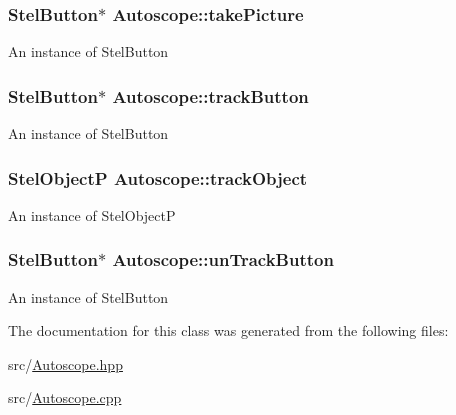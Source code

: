 \subsubsection[{\texorpdfstring{take\+Picture}{takePicture}}]{\setlength{\rightskip}{0pt plus 5cm}Stel\+Button$\ast$ Autoscope\+::take\+Picture\hspace{0.3cm}{\ttfamily [private]}}\hypertarget{class_autoscope_a8f64e1d50e979751403a70008f0d01da}{}\label{class_autoscope_a8f64e1d50e979751403a70008f0d01da}
An instance of Stel\+Button 
\subsubsection[{\texorpdfstring{track\+Button}{trackButton}}]{\setlength{\rightskip}{0pt plus 5cm}Stel\+Button$\ast$ Autoscope\+::track\+Button\hspace{0.3cm}{\ttfamily [private]}}\hypertarget{class_autoscope_a816e3212639b4204e9917704e02b0d09}{}\label{class_autoscope_a816e3212639b4204e9917704e02b0d09}
An instance of Stel\+Button 
\subsubsection[{\texorpdfstring{track\+Object}{trackObject}}]{\setlength{\rightskip}{0pt plus 5cm}Stel\+ObjectP Autoscope\+::track\+Object\hspace{0.3cm}{\ttfamily [private]}}\hypertarget{class_autoscope_a170fbbc7b2a719517912aa3614727021}{}\label{class_autoscope_a170fbbc7b2a719517912aa3614727021}
An instance of Stel\+ObjectP 
\subsubsection[{\texorpdfstring{un\+Track\+Button}{unTrackButton}}]{\setlength{\rightskip}{0pt plus 5cm}Stel\+Button$\ast$ Autoscope\+::un\+Track\+Button\hspace{0.3cm}{\ttfamily [private]}}\hypertarget{class_autoscope_a5d3be6a8522dc18b921936b57c8e661c}{}\label{class_autoscope_a5d3be6a8522dc18b921936b57c8e661c}
An instance of Stel\+Button 

The documentation for this class was generated from the following files\+:\begin{DoxyCompactItemize}
\item 
src/\hyperlink{_autoscope_8hpp}{Autoscope.\+hpp}\item 
src/\hyperlink{_autoscope_8cpp}{Autoscope.\+cpp}\end{DoxyCompactItemize}
